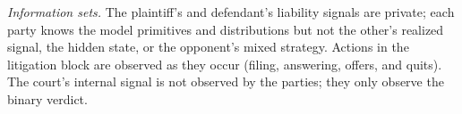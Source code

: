 \documentclass{article}
\begin{document}
\emph{Information sets.} The plaintiff’s and defendant’s liability signals are private; each party knows the model primitives and distributions but not the other’s realized signal, the hidden state, or the opponent’s mixed strategy. Actions in the litigation block are observed as they occur (filing, answering, offers, and quits). The court’s internal signal is not observed by the parties; they only observe the binary verdict.



\printbibliography
\end{document}
